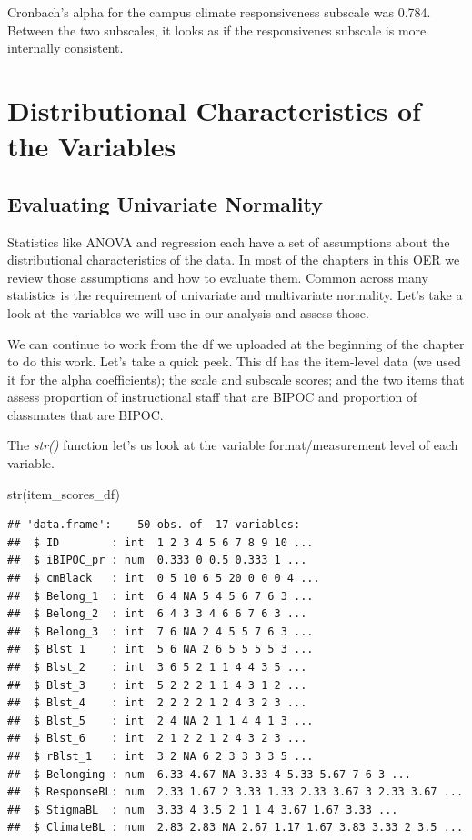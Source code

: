 \documentclass[
]{book}
\newenvironment{Shaded}{\begin{snugshade}}{\end{snugshade}}
\newcommand{\FunctionTok}[1]{\textcolor[rgb]{0.00,0.00,0.00}{#1}}
\newcommand{\NormalTok}[1]{#1}
\begin{document}
Cronbach's alpha for the campus climate responsiveness subscale was 0.784. Between the two subscales, it looks as if the responsivenes subscale is more internally consistent.

\hypertarget{distributional-characteristics-of-the-variables}{%
\section{Distributional Characteristics of the Variables}\label{distributional-characteristics-of-the-variables}}

\hypertarget{evaluating-univariate-normality}{%
\subsection{Evaluating Univariate Normality}\label{evaluating-univariate-normality}}

Statistics like ANOVA and regression each have a set of assumptions about the distributional characteristics of the data. In most of the chapters in this OER we review those assumptions and how to evaluate them. Common across many statistics is the requirement of univariate and multivariate normality. Let's take a look at the variables we will use in our analysis and assess those.

We can continue to work from the df we uploaded at the beginning of the chapter to do this work. Let's take a quick peek. This df has the item-level data (we used it for the alpha coefficients); the scale and subscale scores; and the two items that assess proportion of instructional staff that are BIPOC and proportion of classmates that are BIPOC.

The \emph{str()} function let's us look at the variable format/measurement level of each variable.

\begin{Shaded}
\begin{Highlighting}[]
\FunctionTok{str}\NormalTok{(item\_scores\_df)}
\end{Highlighting}
\end{Shaded}

\begin{verbatim}
## 'data.frame':    50 obs. of  17 variables:
##  $ ID        : int  1 2 3 4 5 6 7 8 9 10 ...
##  $ iBIPOC_pr : num  0.333 0 0.5 0.333 1 ...
##  $ cmBlack   : int  0 5 10 6 5 20 0 0 0 4 ...
##  $ Belong_1  : int  6 4 NA 5 4 5 6 7 6 3 ...
##  $ Belong_2  : int  6 4 3 3 4 6 6 7 6 3 ...
##  $ Belong_3  : int  7 6 NA 2 4 5 5 7 6 3 ...
##  $ Blst_1    : int  5 6 NA 2 6 5 5 5 5 3 ...
##  $ Blst_2    : int  3 6 5 2 1 1 4 4 3 5 ...
##  $ Blst_3    : int  5 2 2 2 1 1 4 3 1 2 ...
##  $ Blst_4    : int  2 2 2 2 1 2 4 3 2 3 ...
##  $ Blst_5    : int  2 4 NA 2 1 1 4 4 1 3 ...
##  $ Blst_6    : int  2 1 2 2 1 2 4 3 2 3 ...
##  $ rBlst_1   : int  3 2 NA 6 2 3 3 3 3 5 ...
##  $ Belonging : num  6.33 4.67 NA 3.33 4 5.33 5.67 7 6 3 ...
##  $ ResponseBL: num  2.33 1.67 2 3.33 1.33 2.33 3.67 3 2.33 3.67 ...
##  $ StigmaBL  : num  3.33 4 3.5 2 1 1 4 3.67 1.67 3.33 ...
##  $ ClimateBL : num  2.83 2.83 NA 2.67 1.17 1.67 3.83 3.33 2 3.5 ...
\end{verbatim}
\end{document}
